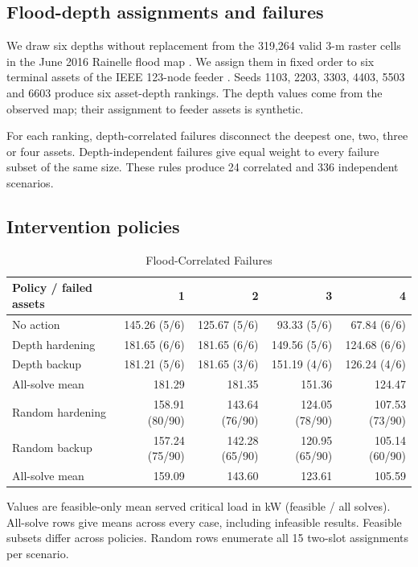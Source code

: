 \documentclass[conference]{IEEEtran}
\begin{document}
\subsection{Flood-depth assignments and failures}

We draw six depths without replacement from the 319,264 valid 3-m raster cells in the June 2016 Rainelle flood map \cite{usgs}. We assign them in fixed order to six terminal assets of the IEEE 123-node feeder \cite{ieee}. Seeds 1103, 2203, 3303, 4403, 5503 and 6603 produce six asset-depth rankings. The depth values come from the observed map; their assignment to feeder assets is synthetic.

For each ranking, depth-correlated failures disconnect the deepest one, two, three or four assets. Depth-independent failures give equal weight to every failure subset of the same size. These rules produce 24 correlated and 336 independent scenarios.

\subsection{Intervention policies}

\begin{table}[!t]
\caption{Flood-Correlated Failures}
\label{tab:corr}
\centering
\renewcommand{\arraystretch}{1.15}
\begin{tabular}{lrrrr}
\toprule
Policy / failed assets & 1 & 2 & 3 & 4 \\
\midrule
No action & 145.26 (5/6) & 125.67 (5/6) & 93.33 (5/6) & 67.84 (6/6) \\
Depth hardening & 181.65 (6/6) & 181.65 (6/6) & 149.56 (5/6) & 124.68 (6/6) \\
Depth backup & 181.21 (5/6) & 181.65 (3/6) & 151.19 (4/6) & 126.24 (4/6) \\
\quad All-solve mean & 181.29 & 181.35 & 151.36 & 124.47 \\
Random hardening & 158.91 (80/90) & 143.64 (76/90) & 124.05 (78/90) & 107.53 (73/90) \\
Random backup & 157.24 (75/90) & 142.28 (65/90) & 120.95 (65/90) & 105.14 (60/90) \\
\quad All-solve mean & 159.09 & 143.60 & 123.61 & 105.59 \\
\bottomrule
\end{tabular}
\par\smallskip
\begin{minipage}{0.95\textwidth}\footnotesize
Values are feasible-only mean served critical load in kW (feasible / all solves). All-solve rows give means across every case, including infeasible results. Feasible subsets differ across policies. Random rows enumerate all 15 two-slot assignments per scenario.
\end{minipage}
\end{table}
\end{document}
